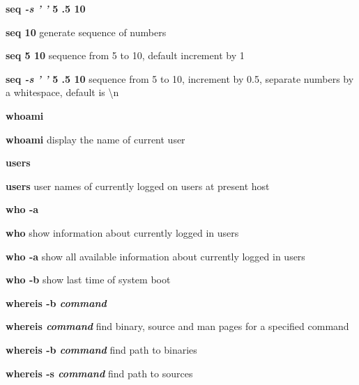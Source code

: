 \documentclass[a4paper,11pt,twoside]{article}
\begin{document}
\vspace{1mm}

\begin{labeling}{\textbf{seq \textit{-s ' '} 5 .5 10}}
\item [\textbf{seq 10}] generate sequence of numbers
\item [\textbf{seq 5 10}] sequence from 5 to 10, default increment by 1
\item [\textbf{seq \textit{-s ' '} 5 .5 10}] sequence from 5 to 10, increment by 0.5, separate numbers by a whitespace, default is \textbackslash n
\end{labeling}

\vspace{1mm}

\begin{labeling}{\textbf{whoami}}
\item [\textbf{whoami}] display the name of current user
\end{labeling}

\vspace{1mm}

\begin{labeling}{\textbf{users}}
\item [\textbf{users}] user names of currently logged on users at present host
\end{labeling}

\vspace{1mm}

\begin{labeling}{\textbf{who -a}}
\item [\textbf{who}] show information about currently logged in users
\item [\textbf{who -a}] show all available information about currently logged in users
\item [\textbf{who -b}] show last time of system boot
\end{labeling}

\vspace{1mm}

\begin{labeling}{\textbf{whereis -b \textit{command}}}
\item [\textbf{whereis \textit{command}}] find binary, source and man pages for a specified command
\item [\textbf{whereis -b \textit{command}}] find path to binaries
\item [\textbf{whereis -s \textit{command}}] find path to sources
\end{labeling}
\end{document}
